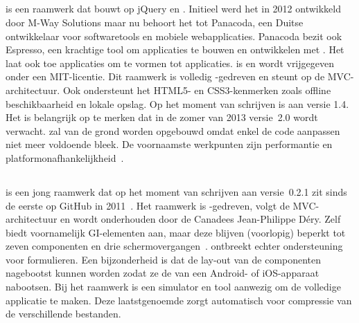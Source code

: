 \subsection{\tmp} %
\tmp{} is een raamwerk dat bouwt op jQuery en \jqm{}.
Initieel werd het in 2012 ontwikkeld door M-Way Solutions maar nu behoort het tot Panacoda,  een Duitse ontwikkelaar voor softwaretools en mobiele webapplicaties.
Panacoda bezit ook Espresso,  een krachtige tool om applicaties te bouwen en ontwikkelen met \tmp{}.
Het laat ook toe applicaties om te vormen tot  applicaties. 
\tmp{} is  en wordt vrijgegeven onder een MIT-licentie.
Dit raamwerk is volledig \js{}-gedreven en steunt op de MVC-architectuur.
Ook ondersteunt het HTML5- en CSS3-kenmerken zoals offline  beschikbaarheid en lokale opslag.
Op het moment van schrijven is \tmp{} aan versie 1.4.
Het is belangrijk op te merken dat in de zomer van 2013 versie~2.0 wordt verwacht.  
\tmp{} zal van de grond worden opgebouwd omdat enkel de code aanpassen niet meer voldoende bleek.  
De voornaamste werkpunten zijn performantie en platformonafhankelijkheid~\cite{Panacoda,Laubach2013}.

\subsection{\moobile} %
\moobile{} is een jong raamwerk dat op het moment van schrijven aan versie~0.2.1 zit sinds de eerste  op GitHub in 2011~\cite{Dery2013}.
Het raamwerk is \js{}-gedreven, volgt de MVC-architectuur en wordt onderhouden door de Canadees Jean-Philippe Déry.
Zelf biedt \moobile{} voornamelijk GI-elementen aan, maar deze blijven (voorlopig) beperkt tot zeven componenten en drie schermovergangen~\cite{Dery2013}.
\moobile{} ontbreekt echter ondersteuning voor formulieren.
Een bijzonderheid is dat de lay-out van de componenten nagebootst kunnen worden zodat ze de  van een Android- of iOS-apparaat nabootsen.
Bij het raamwerk is een simulator en tool aanwezig om de volledige applicatie te maken.
Deze laatstgenoemde zorgt automatisch voor compressie van de verschillende bestanden.


